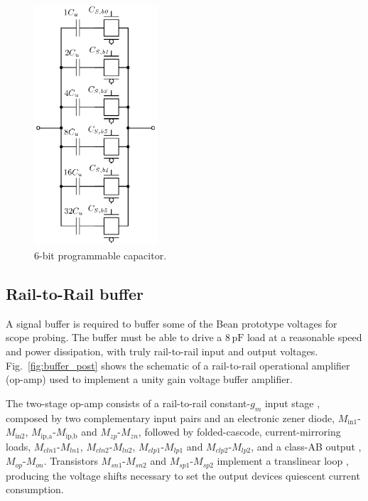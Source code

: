 \begin{figure}[!t]
	\centering
	\includegraphics[width=1.8in]{./Figures/Filter/cap_array_post.eps}
	\caption{6-bit programmable capacitor.}\label{fig:cap_array_post}
\end{figure}

\subsection{Rail-to-Rail buffer}
A signal buffer is required to buffer some of the Bean prototype voltages for scope probing. The buffer must be able to drive a $8\,\text{pF}$ load at a reasonable speed and power dissipation, with truly rail-to-rail input and output voltages. Fig.~\ref{fig:buffer_post} shows the schematic of a rail-to-rail operational amplifier (op-amp) used to implement a unity gain voltage buffer amplifier.

The two-stage op-amp consists of a rail-to-rail constant-$g_m$ input stage \citep{hogervorst101}, composed by two complementary input pairs and an electronic zener diode, $M_\text{in1}$-$M_\text{in2}$, $M_\text{ip,a}$-$M_\text{ip,b}$ and $M_\textit{zp}$-$M_\textit{zn}$,  followed by folded-cascode, current-mirroring loads, \mbox{$M_\textit{cln1}$-$M_\textit{ln1}$}, $M_\textit{cln2}$-$M_\textit{ln2}$, $M_\textit{clp1}$-$M_\textit{lp1}$ and $M_\textit{clp2}$-$M_\textit{lp2}$, and a class-AB output \citep{hogervorst102}, $M_\textit{op}$-$M_\textit{on}$. Transistors $M_\textit{sn1}$-$M_\textit{sn2}$ and $M_\textit{sp1}$-$M_\textit{sp2}$ implement a translinear loop \citep{analogessentials}, producing the voltage shifts necessary to set the output devices quiescent current consumption.

